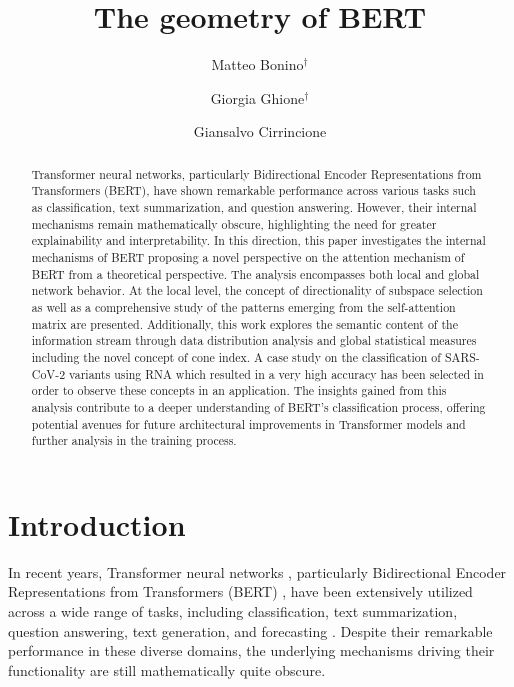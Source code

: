 \documentclass[11pt,a4paper,reqno]{amsart} %
\title{The geometry of BERT}
\author{Matteo Bonino$^{\dag}$}
\author{Giorgia Ghione$^{\dag}$}
\author{Giansalvo Cirrincione}
\theoremstyle{definition}
\numberwithin{equation}{section}          %
\begin{document}
            
\begin{abstract}
Transformer neural networks, particularly Bidirectional Encoder Representations from Transformers (BERT), have shown remarkable performance across various tasks such as classification, text summarization, and question answering. However, their internal mechanisms remain mathematically obscure, highlighting the need for greater explainability and interpretability. 
In this direction, this paper investigates the internal mechanisms of BERT proposing a novel perspective on the attention mechanism of BERT from a theoretical perspective. 
The analysis encompasses both local and global network behavior. At the local level, the concept of directionality of subspace selection as well as a comprehensive study of the patterns emerging from the self-attention matrix are presented. Additionally, this work explores the semantic content of the information stream through data distribution analysis and global statistical measures including the novel concept of cone index. 
A case study on the classification of SARS-CoV-2 variants using RNA which resulted in a very high accuracy has been selected in order to observe these concepts in an application.
The insights gained from this analysis contribute to a deeper understanding of BERT’s classification process, offering potential avenues for future architectural improvements in Transformer models and further analysis in the training process.

\end{abstract}


\maketitle





\section{Introduction} 

In recent years, Transformer neural networks \cite{2017arXiv170603762V}, particularly Bidirectional Encoder Representations from Transformers (BERT) \cite{DevlinBERT}, have been extensively utilized across a wide range of tasks, including classification, text summarization, question answering, text generation, and forecasting \cite{kamath2022transformers}. Despite their remarkable performance in these diverse domains, the underlying mechanisms driving their functionality are still mathematically quite obscure.
\end{document}
